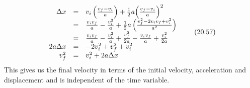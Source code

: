     \begin{equation}
    \begin{array}{ccc}\hfill \Delta x& =& {v}_{i}\left(\frac{{v}_{f}-{v}_{i}}{a}\right)+\frac{1}{2}a{\left(\frac{{v}_{f}-{v}_{i}}{a}\right)}^{2}\hfill \\ & =& \frac{{v}_{i}{v}_{f}}{a}-\frac{v_{i}^{2}}{a}+\frac{1}{2}a\left(\frac{v_{f}^{2}-2{v}_{i}{v}_{f}+v_{i}^{2}}{{a}^{2}}\right)\hfill \\ & =& \frac{{v}_{i}{v}_{f}}{a}-\frac{v_{i}^{2}}{a}+\frac{v_{f}^{2}}{2a}-\frac{{v}_{i}{v}_{f}}{a}+\frac{v_{i}^{2}}{2a}\hfill \\ \hfill 2a\Delta x& =& -2v_{i}^{2}+v_{f}^{2}+v_{i}^{2}\hfill \\ \hfill v_{f}^{2}& =& v_{i}^{2}+2a\Delta x\hfill \end{array}\tag{20.57}
      \end{equation}
          \label{m38796*id77586}This gives us the final velocity in terms of the initial velocity, acceleration and displacement and is independent of the time variable.\par 
\label{m38796*secfhsst!!!underscore!!!id4852}\vspace{.5cm} 
      \noindent
